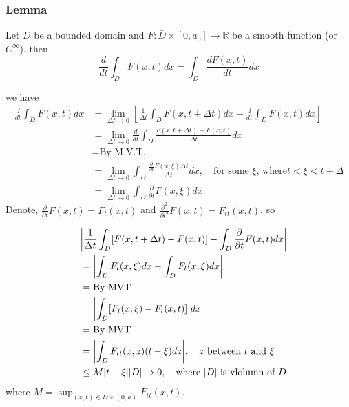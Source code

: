 \subsubsection{Lemma} %

Let $D$ be a bounded domain and $F: \bar{D}\times[0,a_0]\to \mathbb{R}$ be a smooth function (or $C^{\infty}$), then 
\begin{equation}
\frac{d}{dt}\int_{D} F(x,t) dx = \int_D \frac{dF(x,t)}{dt}dx
\end{equation}



we have
\begin{equation}
\begin{aligned}
\frac{d}{dt} \int_D F(x,t) dx
&= \lim_{\Delta t\to 0}\left[
\frac{1}{\Delta t} \int_D F(x,t+\Delta t) dx
- \frac{d}{dt} \int_D F(x,t) dx
\right]\\
&= \lim_{\Delta t\to 0} \frac{d}{dt} \int_D \frac{F(x,t+\Delta t) - F(x,t)}{\Delta t} dx\\
&= \text{By M.V.T.}\\
&= \lim_{\Delta t\to 0} \int_D \frac{\frac{\partial}{\partial t} F(x,\xi) \Delta t}{\Delta t} dx,\quad \text{for some $\xi$, where} t<\xi<t+\Delta\\
&= \lim_{\Delta t\to 0}\int_{D} \frac{\partial}{\partial t}F(x,\xi) dx
\end{aligned}
\end{equation}
Denote, $\displaystyle \frac{\partial}{\partial t}F(x,t) = F_t(x,t)$ and $\displaystyle \frac{\partial^2}{\partial t^2}F(x,t) = F_{tt}(x,t)$, so


\begin{equation}
\begin{aligned}
\quad&
\abs{\frac{1}{\Delta t}\int_D [F(x,t+\Delta t) - F(x,t)] - \int_D \frac{\partial}{\partial t}F(x,t)dx} \\
&= \abs{\int_{D}F_t(x,\xi) dx - \int_{D}F_t(x,\xi)dx}\\
&= \text{By MVT}\\
&= \abs{\int_{D}[F_t(x,\xi) - F_t(x,t)]}dx\\
&= \text{By MVT}\\
&= \abs{\int_{D} F_{tt}(x,z)(t-\xi)dz} ,\quad\text{$z$ between $t$ and $\xi$}\\
&\leq M\abs{t-\xi}\abs{D}\to 0,\quad \text{where $\abs{D}$ is vlolumn of $D$}
\end{aligned}
\end{equation}
where $\displaystyle M=\sup_{(x,t)\in D\times (0,a)} F_{tt}(x,t)$.

